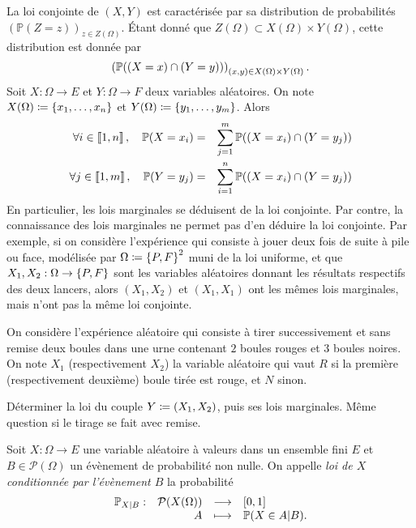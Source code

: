 \documentclass{magnolia}
\begin{document}
\begin{remarques}
\remarque La loi conjointe de $(X,Y)$ est caractérisée par sa distribution de
  probabilités $(\mathbb{P}(Z=z))_{z\in Z(\Omega)}$. Étant donné que
  $Z(\Omega)\subset X(\Omega)\times Y(\Omega)$, cette distribution est
  donnée par
  \[\left(\mathbb{P}((X=x)\cap(Y=y))\right)_{(x,y)\in X(\Omega)\times Y(\Omega)}.\]
\remarque Soit $X:\Omega\to E$ et $Y:\Omega\to F$ deux variables aléatoires. On note
$X(\Omega)\coloneqq\left\{x_1,\ldots,x_n\right\}$ et $Y(\Omega)\coloneqq\left\{y_1,\ldots,y_m\right\}$. Alors
\begin{eqnarray*}
\forall i\in\left\llbracket 1,n\right\rrbracket,\quad \mathbb{P}(X=x_i)&=&\sum_{j=1}^m \mathbb{P}((X=x_i)\cap(Y=y_j))\\
\forall j\in\left\llbracket 1,m\right\rrbracket,\quad \mathbb{P}(Y=y_j)&=&\sum_{i=1}^n \mathbb{P}((X=x_i)\cap(Y=y_j))
\end{eqnarray*}
En particulier, les lois marginales se déduisent de la loi conjointe. Par contre, la
connaissance des lois marginales ne permet pas d'en déduire la loi conjointe. Par exemple,
si on considère l'expérience qui consiste à jouer deux fois de suite à pile ou face,
modélisée par $\Omega\coloneqq\left\{P,F\right\}^2$ muni de la loi uniforme, et que
$X_1,X_2:\Omega\to\left\{P,F\right\}$ sont les variables aléatoires donnant les résultats respectifs
des deux lancers, alors $(X_1,X_2)$ et $(X_1,X_1)$ ont les mêmes lois marginales, mais n'ont
pas la même loi conjointe.
\end{remarques}

\begin{exoUnique}
\exo On considère l'expérience aléatoire qui consiste à tirer successivement et sans remise
  deux boules dans une urne contenant $2$ boules rouges et $3$ boules noires. On note $X_1$
  (respectivement $X_2$) la variable aléatoire qui vaut $R$ si la première (respectivement
  deuxième) boule tirée est rouge, et $N$ sinon.
  \begin{questions}
  \question Déterminer la loi du couple $Y\coloneqq(X_1,X_2)$, puis ses lois marginales.
  \question Même question si le tirage se fait avec remise.
  \end{questions}
\end{exoUnique}

\begin{definition}
Soit $X:\Omega\to E$ une variable aléatoire à valeurs dans un ensemble fini $E$ et $B\in\mathcal{P}(\Omega)$
un évènement de probabilité non nulle. On appelle \emph{loi de $X$ conditionnée par l'évènement $B$}
la probabilité
\[\begin{array}[t]{lrcl} \displaystyle{\mathbb{P}_{X|B}} : & \displaystyle{\mathcal{P}(X(\Omega))} & \longrightarrow & \displaystyle{[0,1]} \\ & \displaystyle{A} & \longmapsto & \displaystyle{\mathbb{P}(X\in A|B).} \end{array}\]
\end{definition}
\end{document}
